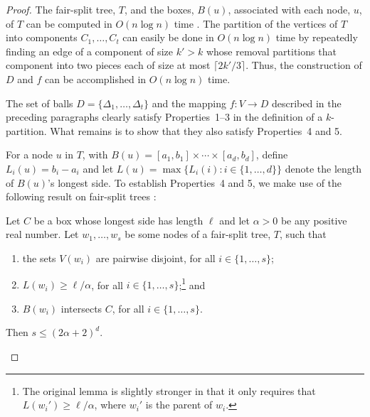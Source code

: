 \documentclass{patmorin}
\begin{document}
\begin{proof}
  The fair-split tree, $T$, and the boxes, $B(u)$, associated
  with each node, $u$, of $T$ can be computed in $O(n\log n)$ time
  \cite{callahan.kosaraju:decomposition}.  The partition of the vertices
  of $T$ into components $C_1,\ldots,C_t$ can easily be done in $O(n\log
  n)$ time by repeatedly finding an edge of a component of size $k'>k$
  whose removal partitions that component into two pieces each of size
  at most $\lceil 2k'/3\rceil$.  Thus, the construction of $D$ and $f$
  can be accomplished in $O(n\log n)$ time.

  The set of balls $D=\{\Delta_1,\ldots,\Delta_t\}$ and the mapping
  $f:V\to D$ described in the preceding paragraphs clearly satisfy
  Properties~1--3 in the definition of a $k$-partition.  What remains
  is to show that they also satisfy Properties~4 and 5. 

  For a node $u$ in $T$, with $B(u)=[a_1,b_1]\times\cdots\times[a_d,b_d]$,
  define $L_i(u)=b_i-a_i$ and let $L(u)=\max\{L_i(i):i\in\{1,\ldots,d\}\}$
  denote the length of $B(u)$'s longest side.   To establish
  Properties~4 and 5, we make use of the following result on fair-split
  trees \cite[Lemma~9.4.3]{narasimhan.smid:geometric}:

  \begin{lem}
     Let $C$ be a box whose longest side has length $\ell$ and let
     $\alpha >0$ be any positive real number.  Let $w_1,\ldots,w_s$
     be some nodes of a fair-split tree, $T$, such that
     \begin{enumerate}
       \item the sets $V(w_i)$ are pairwise disjoint, for all $i\in\{1,\ldots,s\}$;
       \item $L(w_i)\ge \ell/\alpha$, for all
          $i\in\{1,\ldots,s\}$;\footnote{The original lemma
          \cite[Lemma~9.4.3]{narasimhan.smid:geometric} is slightly
          stronger in that it only requires that $L(w_i')\ge \ell/\alpha$,
          where $w_i'$ is the parent of $w_i$.} and
       \item $B(w_i)$ intersects $C$, for all $i\in\{1,\ldots,s\}$.
     \end{enumerate}
     Then $s\le (2\alpha + 2)^d$.
  \end{lem}


\end{proof}
\end{document}
